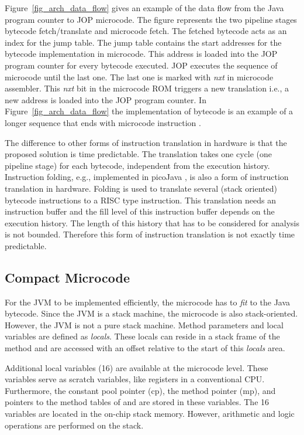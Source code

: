 Figure~\ref{fig_arch_data_flow} gives an example of the data flow
from the Java program counter to JOP microcode. The figure
represents the two pipeline stages bytecode fetch/translate and
microcode fetch. The fetched bytecode acts as an index for the jump
table. The jump table contains the start addresses for the bytecode
implementation in microcode. This address is loaded into the JOP
program counter for every bytecode executed. JOP executes the
sequence of microcode until the last one. The last one is marked
with \emph{nxt} in microcode assembler. This \emph{nxt} bit in the
microcode ROM triggers a new translation i.e., a new address is
loaded into the JOP program counter. In
Figure~\ref{fig_arch_data_flow} the implementation of bytecode
 is an example of a longer sequence that ends with
microcode instruction .

The difference to other forms of instruction translation in hardware
is that the proposed solution is time predictable. The translation
takes one cycle (one pipeline stage) for each bytecode, independent
from the execution history. Instruction folding, e.g., implemented
in picoJava \cite{pJ1,pjMicroArch}, is also a form of instruction
translation in hardware. Folding is used to translate several (stack
oriented) bytecode instructions to a RISC type instruction. This
translation needs an instruction buffer and the fill level of this
instruction buffer depends on the execution history. The length of
this history that has to be considered for analysis is not bounded.
Therefore this form of instruction translation is not exactly time
predictable.


\subsection{Compact Microcode}

For the JVM to be implemented efficiently, the microcode has to
\emph{fit} to the Java bytecode. Since the JVM is a stack machine,
the microcode is also stack-oriented. However, the JVM is not a pure
stack machine. Method parameters and local variables are defined as
\emph{locals}. These locals can reside in a stack frame of the
method and are accessed with an offset relative to the start of this
\emph{locals} area.

Additional local variables (16) are available at the microcode level.
These variables serve as scratch variables, like registers in a
conventional CPU. Furthermore, the constant pool pointer (cp), the
method pointer (mp), and pointers to the method tables of
 and  are stored in these
variables. The 16 variables are located in the on-chip stack memory.
However, arithmetic and logic operations are performed on the stack.

